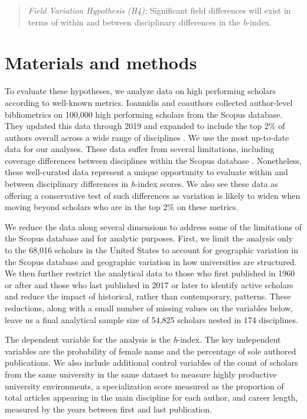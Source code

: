 \documentclass[
  10pt,
  letterpaper,
]{article}
\begin{document}
\begin{quote}
\emph{Field Variation Hypothesis (H4):} Significant field differences
will exist in terms of within and between disciplinary differences in
the \emph{h}-index.
\end{quote}

\hypertarget{materials-and-methods}{%
\section{Materials and methods}\label{materials-and-methods}}

To evaluate these hypotheses, we analyze data on high performing
scholars according to well-known metrics. Ioannidis and coauthors
\citep{ioannidis_standardized_2019} collected author-level bibliometrics
on 100,000 high performing scholars from the Scopus database. They
updated this data through 2019 and expanded to include the top 2\% of
authors overall across a wide range of disciplines
\citep{ioannidis_updated_2020}. We use the most up-to-date data for our
analyses. These data suffer from several limitations, including coverage
differences between disciplines within the Scopus database
\citep{mongeon_journal_2016, singh_journal_2021}. Nonetheless, these
well-curated data represent a unique opportunity to evaluate within and
between disciplinary differences in \emph{h}-index scores. We also see
these data as offering a conservative test of such differences as
variation is likely to widen when moving beyond scholars who are in the
top 2\% on these metrics.

We reduce the data along several dimensions to address some of the
limitations of the Scopus database and for analytic purposes. First, we
limit the analysis only to the 68,016 scholars in the United States to
account for geographic variation in the Scopus database and geographic
variation in how universities are structured. We then further restrict
the analytical data to those who first published in 1960 or after and
those who last published in 2017 or later to identify active scholars
and reduce the impact of historical, rather than contemporary, patterns.
These reductions, along with a small number of missing values on the
variables below, leave us a final analytical sample size of 54,825
scholars nested in 174 disciplines.

The dependent variable for the analysis is the \emph{h}-index. The key
independent variables are the probability of female name and the
percentage of sole authored publications. We also include additional
control variables of the count of scholars from the same university in
the same dataset to measure highly productive university environments, a
specialization score measured as the proportion of total articles
appearing in the main discipline for each author, and career length,
measured by the years between first and last publication.
\end{document}
